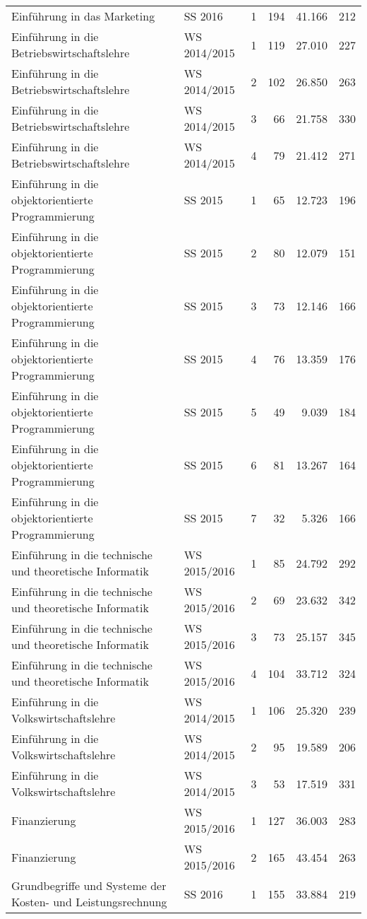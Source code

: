 \begin{longtable}{lllrrr}
Einführung in das Marketing & SS 2016 & 1 & 194 & 41.166 & 212\\
Einführung in die Betriebswirtschaftslehre & WS 2014/2015 & 1 & 119 & 27.010 & 227\\
Einführung in die Betriebswirtschaftslehre & WS 2014/2015 & 2 & 102 & 26.850 & 263\\
Einführung in die Betriebswirtschaftslehre & WS 2014/2015 & 3 & 66 & 21.758 & 330\\
Einführung in die Betriebswirtschaftslehre & WS 2014/2015 & 4 & 79 & 21.412 & 271\\
Einführung in die objektorientierte Programmierung & SS 2015 & 1 & 65 & 12.723 & 196\\
Einführung in die objektorientierte Programmierung & SS 2015 & 2 & 80 & 12.079 & 151\\
Einführung in die objektorientierte Programmierung & SS 2015 & 3 & 73 & 12.146 & 166\\
Einführung in die objektorientierte Programmierung & SS 2015 & 4 & 76 & 13.359 & 176\\
Einführung in die objektorientierte Programmierung & SS 2015 & 5 & 49 & 9.039 & 184\\
Einführung in die objektorientierte Programmierung & SS 2015 & 6 & 81 & 13.267 & 164\\
Einführung in die objektorientierte Programmierung & SS 2015 & 7 & 32 & 5.326 & 166\\
Einführung in die technische und theoretische Informatik & WS 2015/2016 & 1 & 85 & 24.792 & 292\\
Einführung in die technische und theoretische Informatik & WS 2015/2016 & 2 & 69 & 23.632 & 342\\
Einführung in die technische und theoretische Informatik & WS 2015/2016 & 3 & 73 & 25.157 & 345\\
Einführung in die technische und theoretische Informatik & WS 2015/2016 & 4 & 104 & 33.712 & 324\\
Einführung in die Volkswirtschaftslehre & WS 2014/2015 & 1 & 106 & 25.320 & 239\\
Einführung in die Volkswirtschaftslehre & WS 2014/2015 & 2 & 95 & 19.589 & 206\\
Einführung in die Volkswirtschaftslehre & WS 2014/2015 & 3 & 53 & 17.519 & 331\\
Finanzierung & WS 2015/2016 & 1 & 127 & 36.003 & 283\\
Finanzierung & WS 2015/2016 & 2 & 165 & 43.454 & 263\\
Grundbegriffe und Systeme der Kosten- und Leistungsrechnung & SS 2016 & 1 & 155 & 33.884 & 219\\

\end{longtable}
